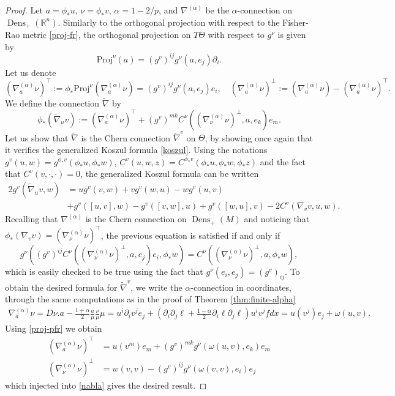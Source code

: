 \documentclass[11pt]{amsart}
\theoremstyle{definition}
\newcommand{\R}{\mathbb R}
\newcommand{\Dens}{\operatorname{Dens}_+(M)}
\newcommand{\DensRn}{\operatorname{Dens}_+(\R^n)}
\newcommand{\nablatilde}{\tilde{\nabla}}
\begin{document}
\begin{proof}
Let $a=\phi_*u$, $\nu=\phi_*v$, $\alpha=1-2/p$, and $\nabla^{(\alpha)}$ be the $\alpha$-connection on $\DensRn$. Similarly to the orthogonal projection with respect to the Fisher-Rao metric \eqref{proj-fr}, the orthogonal projection on $T\Theta$ with respect to $g^\nu$ is given by
\begin{equation}\label{proj-pfr}
\mathrm{Proj}^\nu(a)=(g^v)^{ij} g^\nu(a, e_j)\partial_i.
\end{equation}
Let us denote
$$(\nabla^{(\alpha)}_a\nu)^\top:=\phi_*\mathrm{Proj}^\nu\left(\nabla^{(\alpha)}_a\nu\right)=(g^v)^{ij} g^\nu(a, e_j)e_i, \quad (\nabla^{(\alpha)}_a\nu)^\perp:=(\nabla^{(\alpha)}_a\nu) - (\nabla^{(\alpha)}_a\nu)^\top.$$
We define the connection $\nablatilde$ by
\begin{equation}\label{nabla}
\phi_*(\nablatilde_uv):=(\nabla^{(\alpha)}_a\nu)^\top + (g^v)^{mk} C^\nu\left((\nabla^{(\alpha)}_\nu\nu)^\perp, a, e_k\right)e_m.
\end{equation}
Let us show that $\nablatilde$ is the Chern connection $\nablatilde^v$ on $\Theta$, by showing once again that it verifies the generalized Koszul formula \eqref{koszul}. Using the notations $g^v(u,w)=g^{\phi_*v}(\phi_*u,\phi_*w)$, $C^v(u,w,z)=C^{\phi_*v}(\phi_*u,\phi_*w,\phi_*z)$ and the fact that $C^v(v,\cdot,\cdot)=0$, the generalized Koszul formula can be written
\begin{align*}
2g^v(\nablatilde_uv,w)&=ug^v(v,w)+vg^v(w,u)-wg^v(u,v)\\
&+g^v([u,v],w)-g^v([v,w],u)+g^v([w,u],v)-2C^v(\nabla_vv,u,w).
\end{align*}
Recalling that $\nabla^{(\alpha)}$ is the Chern connection on $\Dens$ and noticing that $\phi_*(\nabla_vv)=(\nabla^{(\alpha)}_\nu\nu)^\top$, the previous equation is satisfied if and only if
$$g^\nu\left((g^v)^{ij} C^\nu\left((\nabla^{(\alpha)}_\nu\nu)^\perp, a, e_j\right)e_i,\phi_*w\right)=C^\nu\left((\nabla^{(\alpha)}_\nu\nu)^\perp,a,\phi_*w\right),$$
which is easily checked to be true using the fact that $ g^\nu(e_i,e_j)=(g^v)_{ij}$. To obtain the desired formula for $\nablatilde^v$, we write the $\alpha$-connection in coordinates, through the same computations as in the proof of Theorem \ref{thm:finite-alpha}
\begin{align*}
\nabla^{(\alpha)}_a\nu=D\nu.a-\frac{1+\alpha}{2}\frac{a}{\mu}\frac{\nu}{\mu}\mu=u^i\partial_iv^je_j + \left(\partial_i\partial_j\ell + \frac{1-\alpha}{2}\partial_i\ell\partial_j\ell\right)u^iv^jfdx=u(v^j)e_j+\omega(u,v).
\end{align*}
Using \eqref{proj-pfr} we obtain
\begin{align*}
(\nabla^{(\alpha)}_a\nu)^\top&=u(v^m)e_m+(g^v)^{mk} g^\nu(\omega(u,v),e_k)e_m\\
(\nabla^{(\alpha)}_\nu\nu)^\perp&=w(v,v)-(g^v)^{ij} g^\nu(\omega(v,v),e_i)e_j
\end{align*}
which injected into \eqref{nabla} gives the desired result.
\end{proof}
\end{document}
